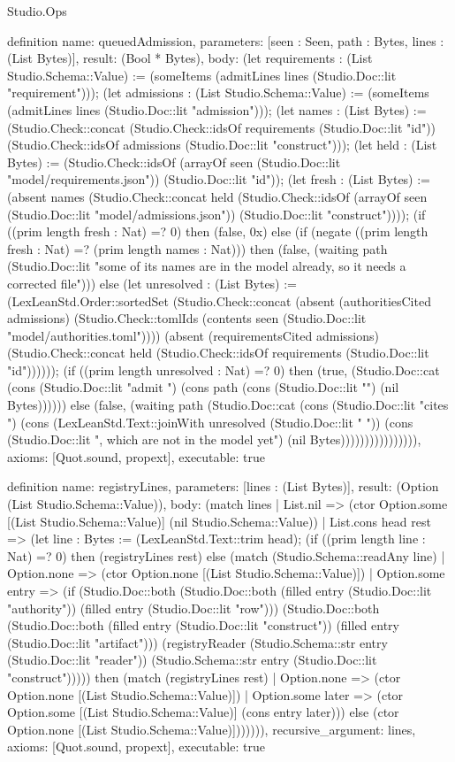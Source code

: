 \begin{lexlean}{Studio.Ops}
\begin{semanticmodule}
{definition{
  name: queuedAdmission,
  parameters: [seen : Seen, path : Bytes, lines : (List Bytes)],
  result: (Bool * Bytes),
  body: (let requirements : (List Studio.Schema::Value) := (someItems (admitLines lines (Studio.Doc::lit "requirement"))); (let admissions : (List Studio.Schema::Value) := (someItems (admitLines lines (Studio.Doc::lit "admission"))); (let names : (List Bytes) := (Studio.Check::concat (Studio.Check::idsOf requirements (Studio.Doc::lit "id")) (Studio.Check::idsOf admissions (Studio.Doc::lit "construct"))); (let held : (List Bytes) := (Studio.Check::idsOf (arrayOf seen (Studio.Doc::lit "model/requirements.json")) (Studio.Doc::lit "id")); (let fresh : (List Bytes) := (absent names (Studio.Check::concat held (Studio.Check::idsOf (arrayOf seen (Studio.Doc::lit "model/admissions.json")) (Studio.Doc::lit "construct")))); (if ((prim length fresh : Nat) =? 0) then (false, 0x) else (if (negate ((prim length fresh : Nat) =? (prim length names : Nat))) then (false, (waiting path (Studio.Doc::lit "some of its names are in the model already, so it needs a corrected file"))) else (let unresolved : (List Bytes) := (LexLeanStd.Order::sortedSet (Studio.Check::concat (absent (authoritiesCited admissions) (Studio.Check::tomlIds (contents seen (Studio.Doc::lit "model/authorities.toml")))) (absent (requirementsCited admissions) (Studio.Check::concat held (Studio.Check::idsOf requirements (Studio.Doc::lit "id")))))); (if ((prim length unresolved : Nat) =? 0) then (true, (Studio.Doc::cat (cons (Studio.Doc::lit "admit ") (cons path (cons (Studio.Doc::lit "\n") (nil Bytes)))))) else (false, (waiting path (Studio.Doc::cat (cons (Studio.Doc::lit "cites ") (cons (LexLeanStd.Text::joinWith unresolved (Studio.Doc::lit " ")) (cons (Studio.Doc::lit ", which are not in the model yet") (nil Bytes)))))))))))))))),
  axioms: [Quot.sound, propext],
  executable: true
}

definition{
  name: registryLines,
  parameters: [lines : (List Bytes)],
  result: (Option (List Studio.Schema::Value)),
  body: (match lines
    | List.nil => (ctor Option.some [(List Studio.Schema::Value)] (nil Studio.Schema::Value))
    | List.cons head rest => (let line : Bytes := (LexLeanStd.Text::trim head); (if ((prim length line : Nat) =? 0) then (registryLines rest) else (match (Studio.Schema::readAny line)
      | Option.none => (ctor Option.none [(List Studio.Schema::Value)])
      | Option.some entry => (if (Studio.Doc::both (Studio.Doc::both (filled entry (Studio.Doc::lit "authority")) (filled entry (Studio.Doc::lit "row"))) (Studio.Doc::both (Studio.Doc::both (filled entry (Studio.Doc::lit "construct")) (filled entry (Studio.Doc::lit "artifact"))) (registryReader (Studio.Schema::str entry (Studio.Doc::lit "reader")) (Studio.Schema::str entry (Studio.Doc::lit "construct"))))) then (match (registryLines rest)
        | Option.none => (ctor Option.none [(List Studio.Schema::Value)])
        | Option.some later => (ctor Option.some [(List Studio.Schema::Value)] (cons entry later))) else (ctor Option.none [(List Studio.Schema::Value)])))))),
  recursive_argument: lines,
  axioms: [Quot.sound, propext],
  executable: true
}

}
\end{semanticmodule}
\end{lexlean}
